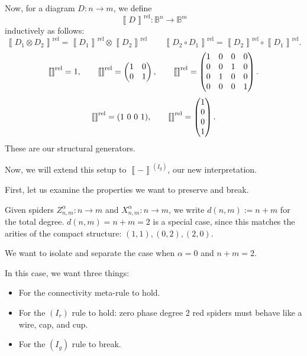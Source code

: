 \documentclass[copyright,creativecommons]{eptcs}
\newcommand{\typedfig}[1]{\IfFileExists{latex_typed/b_rule_note/figures/#1.tikz}{}{}}
\newcommand{\zxfig}[1]{\vcenter{\hbox{\scalebox{1}{\typedfig{#1}}}}}
\newcommand{\sem}[1]{\left\llbracket #1 \right\rrbracket}
\newcommand{\bool}{\mathbb{B}}
\theoremstyle{definition}
\theoremstyle{remark}
\begin{document}
Now, for a diagram \(D:n\to m\), we define
\[
\sem{D}^{\mathrm{rel}}:\bool^n\to\bool^m
\]
inductively as follows:
\[
\sem{D_1\otimes D_2}^{\mathrm{rel}}=\sem{D_1}^{\mathrm{rel}}\otimes\sem{D_2}^{\mathrm{rel}}
\qquad
\sem{D_2\circ D_1}^{\mathrm{rel}}=\sem{D_2}^{\mathrm{rel}}\circ\sem{D_1}^{\mathrm{rel}}.
\]
\[
\sem{\zxfig{empty-diagram}}^{\mathrm{rel}}=1,
\qquad
\sem{\zxfig{single-line}}^{\mathrm{rel}}=
\begin{pmatrix}1&0\\0&1\end{pmatrix},
\qquad
\sem{\zxfig{crossing}}^{\mathrm{rel}}=
\begin{pmatrix}
1&0&0&0\\
0&0&1&0\\
0&1&0&0\\
0&0&0&1
\end{pmatrix}.
\]
\[
\sem{\zxfig{cup}}^{\mathrm{rel}}=(1\ 0\ 0\ 1),
\qquad
\sem{\zxfig{caps}}^{\mathrm{rel}}=
\begin{pmatrix}1\\0\\0\\1\end{pmatrix}.
\]
These are our structural generators.

\bigskip

Now, we will extend this setup to \(\sem{-}^{(I_g)}\), our
new interpretation.

\bigskip

First, let us examine the properties we want to
preserve and break.

\bigskip

Given spiders \(Z^\alpha_{n,m}:n\to m\) and \(X^\alpha_{n,m}:n\to m\),
we write \(d(n,m):=n+m\) for the total degree.
\(d(n,m)=n+m=2\) is a special case, since this
matches the arities of the compact structure: \((1,1),(0,2),(2,0)\).

\bigskip

We want to isolate and separate the case
when \(\alpha=0\) and \(n+m=2\).

\bigskip

In this case, we want three things:
\begin{itemize}
    \item For the connectivity meta-rule to hold.
    \item For the \((I_r)\) rule to hold: zero phase degree 2 red spiders must behave like a wire, cap, and cup.
    \item For the \((I_g)\) rule to break.
\end{itemize}
\end{document}
